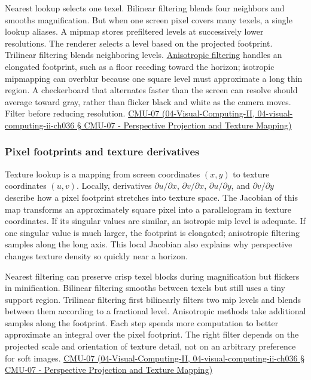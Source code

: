Nearest lookup selects one texel. Bilinear filtering blends four neighbors and smooths magnification. But when one screen pixel covers many texels, a single lookup aliases. A mipmap stores prefiltered levels at successively lower resolutions. The renderer selects a level based on the projected footprint. Trilinear filtering blends neighboring levels. \hyperref[appendix-d5b3c692d9f0]{Anisotropic filtering} handles an elongated footprint, such as a floor receding toward the horizon; isotropic mipmapping can overblur because one square level must approximate a long thin region. A checkerboard that alternates faster than the screen can resolve should average toward gray, rather than flicker black and white as the camera moves. Filter before reducing resolution. \href{}{CMU-07 (04-Visual-Computing-II, 04-visual-computing-ii-ch036 § CMU-07 - Perspective Projection and Texture Mapping)}

\subsubsection{Pixel footprints and texture derivatives}\label{pixel-footprints-and-texture-derivatives}

Texture lookup is a mapping from screen coordinates \((x,y)\) to texture coordinates \((u,v)\). Locally, derivatives \(\partial u/\partial x\), \(\partial v/\partial x\), \(\partial u/\partial y\), and \(\partial v/\partial y\) describe how a pixel footprint stretches into texture space. The Jacobian of this map transforms an approximately square pixel into a parallelogram in texture coordinates. If its singular values are similar, an isotropic mip level is adequate. If one singular value is much larger, the footprint is elongated; anisotropic filtering samples along the long axis. This local Jacobian also explains why perspective changes texture density so quickly near a horizon.

Nearest filtering can preserve crisp texel blocks during magnification but flickers in minification. Bilinear filtering smooths between texels but still uses a tiny support region. Trilinear filtering first bilinearly filters two mip levels and blends between them according to a fractional level. Anisotropic methods take additional samples along the footprint. Each step spends more computation to better approximate an integral over the pixel footprint. The right filter depends on the projected scale and orientation of texture detail, not on an arbitrary preference for soft images. \href{}{CMU-07 (04-Visual-Computing-II, 04-visual-computing-ii-ch036 § CMU-07 - Perspective Projection and Texture Mapping)}

